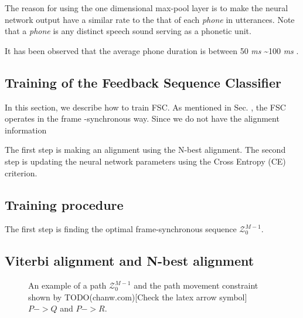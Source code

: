 \documentclass{article}
\begin{document}
The reason for using the one dimensional max-pool layer
is to make the neural network output have a similar rate to the 
that of each {\it phone} in utterances. Note that a {\it phone} 
is any distinct speech sound serving as a phonetic unit. 

It has been observed that the average phone duration is between 50 {\it ms}
\textasciitilde 100 {\it ms} \cite{x_wang_icslp_1996_00, z_bartosz_ltc_2009_00}.









\subsection{Training of the Feedback Sequence Classifier}
In this section, we describe how to train FSC. As mentioned in Sec. 
\label{ref:neural_network_structure}, the FSC operates in the frame
-synchronous way. Since we do not have the alignment information


The first step is making an
alignment using the N-best alignment. The second step is updating the
neural network parameters using the Cross Entropy (CE) criterion. 

\subsection{Training procedure}

The first step is finding the optimal frame-synchronous sequence
$\mathcal{Z}_0^{M-1}$.   

\begin{algorithmic}
\end{algorithmic}



\subsection{Viterbi alignment and N-best alignment}


\begin{figure}
  \centering
    \resizebox{100mm}{!}{
      
    } 
    \caption {
      An example of a path $\mathcal{Z}_{0}^{M-1}$ and the path movement 
      constraint shown by TODO(chanw.com)[Check the latex arrow symbol] $P -> Q$ and $P -> R$. 
      \label{fig:path_alignment}
    }
\end{figure}
\end{document}
